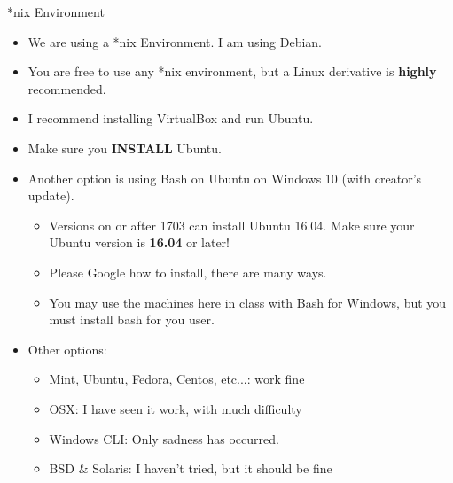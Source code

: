 \documentclass{beamer}
\begin{document}
\begin{frame}{*nix Environment}
\begin{itemize}
\item We are using a *nix Environment.  I am using Debian.
\item You are free to use any *nix environment, but a Linux derivative is \textbf{highly} recommended.
\item I recommend installing VirtualBox and run Ubuntu.
\item Make sure you \textbf{INSTALL} Ubuntu.
\item Another option is using Bash on Ubuntu on Windows 10 (with creator's update).
\begin{itemize}
\item Versions on or after 1703 can install Ubuntu 16.04. Make sure your Ubuntu version is \textbf{16.04} or later!
\item Please Google how to install, there are many ways.
\item You may use the machines here in class with Bash for Windows, but you must install bash for you user.
\end{itemize}
\item Other options:
\begin{itemize}
\item Mint, Ubuntu, Fedora, Centos, etc...: work fine
\item OSX: I have seen it work, with much difficulty
\item Windows CLI: Only sadness has occurred.
\item BSD \& Solaris: I haven't tried, but it should be fine
\end{itemize}
\end{itemize}
\end{frame}
\end{document}
